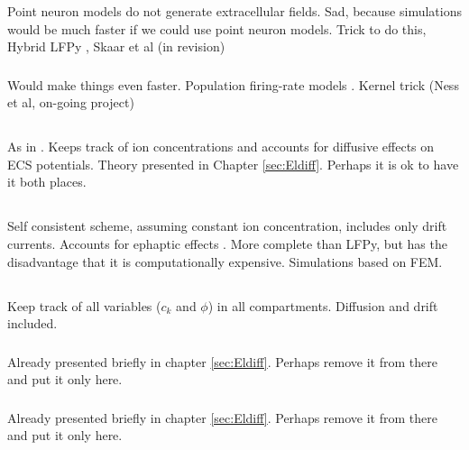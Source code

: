 \subsubsection{}
Point neuron models do not generate extracellular fields. Sad, because simulations would be much faster if we could use point neuron models. Trick to do this, Hybrid LFPy \citep{Hagen2016}, Skaar et al (in revision)

\subsubsection{}
Would make things even faster. Population firing-rate models  \citep{Hagen2016}. Kernel trick (Ness et al, on-going project) 


\subsection{}
As in \cite{Solbra2018}. Keeps track of ion concentrations and accounts for diffusive effects on ECS potentials. Theory presented in Chapter \ref{sec:Eldiff}. Perhaps it is ok to have it both places. 


\subsection{}
Self consistent scheme, assuming constant ion concentration, includes only drift currents. Accounts for ephaptic effects \cite{Tveito2019}. More complete than LFPy, but has the disadvantage that it is computationally expensive. Simulations based on FEM.


\subsection{}
Keep track of all variables ($c_k$ and $\phi$) in all compartments. Diffusion and drift included. 

\subsubsection{}
Already presented briefly in chapter \ref{sec:Eldiff}. Perhaps remove it from there and put it only here. 

\subsubsection{}
Already presented briefly in chapter \ref{sec:Eldiff}. Perhaps remove it from there and put it only here. 

